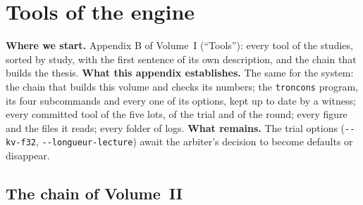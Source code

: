 \newcommand{\option}[1]{\texttt{-{}-#1}}
\chapter{Tools of the engine}\label{t2ann:outils}

\begin{origine}
\textbf{Where we start.} Appendix B of Volume~I (\enquote{Tools}): every tool of the studies, sorted by study, with the first sentence of its own description, and the chain that builds the thesis.
\textbf{What this appendix establishes.} The same for the system: the chain that builds this volume and checks its numbers; the \texttt{troncons} program, its four subcommands and every one of its options, kept up to date by a witness; every committed tool of the five lots, of the trial and of the round; every figure and the files it reads; every folder of logs.
\textbf{What remains.} The trial options (\option{kv-f32}, \option{longueur-lecture}) await the arbiter's decision to become defaults or disappear.
\end{origine}

\section{The chain of Volume~II}\label{t2ann:sec:chaine}

